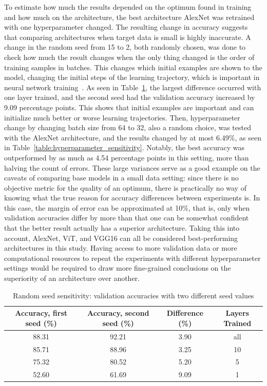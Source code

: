 \documentclass[english,twoside,openright]{UH_DS_MSc}
\begin{document}
To estimate how much the results depended on the optimum found in training and how much on the architecture, 
the best architecture AlexNet was retrained with one hyperparameter changed. The resulting 
change in accuracy suggests that comparing architectures when target data is small is highly inaccurate. 
A change in the random seed from 15 to 2, both randomly chosen, was done to check how much the result changes 
when the only thing changed is the order of training samples in batches. This changes which initial examples are shown to the model,
changing the initial steps of the learning trajectory, which is important in neural network training~\cite{transferlearning_survey}.
 As seen in Table~\ref{table:random_seed_sensitivity}, the largest difference occurred with one layer 
trained, and the second seed had the validation accuracy increased by 9.09 percentage points. This shows that initial examples 
are important and can initialize much better or worse learning trajectories. Then, hyperparameter change 
by changing batch size from 64 to 32, also a random choice, was tested with the AlexNet architecture, and the results 
changed by at most 6.49\%, as seen in Table~\ref{table:hyperparameter_sensitivity}. Notably, the best accuracy was outperformed by as much as 4.54 percentage points 
in this setting, more than halving the count of errors. These large variances serve as a good example on the caveats of comparing 
base models in a small data setting: since there is no objective metric for the quality of an optimum, there 
is practically no way of knowing what the true reason for accuracy differences between experiments is. In this case, the 
margin of error can be approximated at 10\%, that is, only when validation accuracies differ by more than that one can be 
somewhat confident that the better result actually has a superior architecture. Taking this into account, AlexNet, ViT, and VGG16 
can all be considered best-performing architectures in this study. Having access to more validation data or more computational 
resources to repeat the experiments with different hyperparameter settings would be required to draw more fine-grained conclusions on the 
superiority of an architecture over another.

\begin{table}[ht]
    \centering
        \scriptsize
        \begin{tabular}{|c|c|c|c|}
            \hline
            \textbf{Accuracy, first seed (\%)} & \textbf{Accuracy, second seed (\%)} & \textbf{Difference (\%)} & \textbf{Layers Trained} \\ \hline
            88.31 & 92.21 & 3.90  & all \\\hline
            85.71 & 88.96 & 3.25 & 10  \\\hline
            75.32 & 80.52 & 5.20  & 5   \\\hline
            52.60 & 61.69 & 9.09 & 1   \\\hline
        \end{tabular}
    \caption{Random seed sensitivity: validation accuracies with two different seed values}
    \label{table:random_seed_sensitivity}
\end{table}
\end{document}
